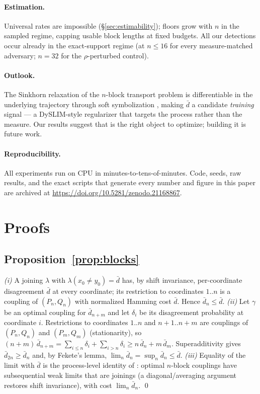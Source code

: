 \documentclass[11pt]{article}
\newcommand{\dbar}{\bar d}
\begin{document}
\paragraph{Estimation.} Universal rates are impossible (\S\ref{sec:estimability});
floors grow with $n$ in the sampled regime, capping usable block lengths at fixed
budgets. All our detections occur already in the exact-support regime (at $n\le16$
for every measure-matched adversary; $n=32$ for the $\rho$-perturbed control).

\paragraph{Outlook.} The Sinkhorn relaxation of the $n$-block transport problem is
differentiable in the underlying trajectory through soft symbolization
\citep{cuturi2013sinkhorn}, making $\dbar$ a candidate \emph{training} signal ---
a DySLIM-style regularizer that targets the process rather than the measure. Our
results suggest that is the right object to optimize; building it is future work.

\paragraph{Reproducibility.} All experiments run on CPU in minutes-to-tens-of-minutes.
Code, seeds, raw results, and the exact scripts that generate every number and figure
in this paper are archived at \url{https://doi.org/10.5281/zenodo.21168867}.




\appendix

\section{Proofs}\label{app:proofs}

\subsection{Proposition~\ref{prop:blocks}}
\emph{(i)} A joining $\lambda$ with $\lambda(x_0\ne y_0)=\dbar$ has, by shift
invariance, per-coordinate disagreement $\dbar$ at every coordinate; its restriction to
coordinates $1..n$ is a coupling of $(P_n,Q_n)$ with normalized Hamming cost $\dbar$.
Hence $\dbar_n\le\dbar$.
\emph{(ii)} Let $\gamma$ be an optimal coupling for $\dbar_{n+m}$ and let $\delta_i$ be
its disagreement probability at coordinate $i$. Restrictions to coordinates $1..n$ and
$n{+}1..n{+}m$ are couplings of $(P_n,Q_n)$ and $(P_m,Q_m)$ (stationarity), so
$(n+m)\,\dbar_{n+m}=\sum_{i\le n}\delta_i+\sum_{i>n}\delta_i\ge n\,\dbar_n+m\,\dbar_m$.
Superadditivity gives $\dbar_{2n}\ge\dbar_n$ and, by Fekete's lemma,
$\lim_n\dbar_n=\sup_n\dbar_n\le\dbar$.
\emph{(iii)} Equality of the limit with $\dbar$ is the process-level identity of
\citet{gray1975generalization}: optimal $n$-block couplings have subsequential weak
limits that are joinings (a diagonal/averaging argument restores shift invariance),
with cost $\lim_n\dbar_n$. \qed
\end{document}
